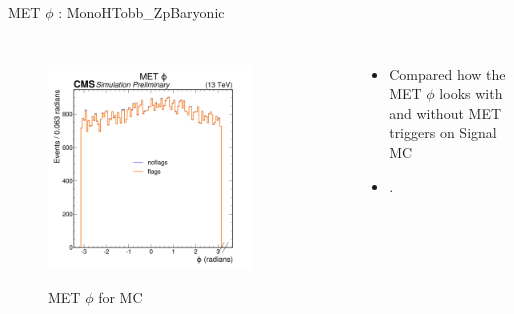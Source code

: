 \documentclass[10pt,xcolor=dvipsnames,aspectratio=169]{beamer}
\begin{document}
    \begin{frame}[fragile]{MET $\phi$ : MonoHTobb\_ZpBaryonic} 
      \begin{columns}
      \begin{figure} 
      \centering 
       \includegraphics[width=0.8\textwidth]{../Archive/KinemPlots/MCphiMETflags.png }
      \label{METData} 
      \caption{MET $\phi$ for MC}
      \end{figure} 
      \begin{itemize} 
      \raggedright 
      \small
      \item Compared how the MET $\phi$ looks with and without MET triggers on Signal MC
      \item .
      \end{itemize}
      \end{columns} 
      \end{frame}



\end{document}
